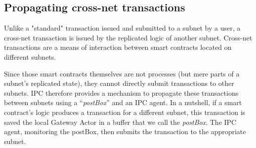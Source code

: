 

\subsection{Propagating cross-net transactions}

Unlike a "standard" transaction issued and submitted to a subnet by a user,
a cross-net transaction is issued by the replicated logic of another subnet.
Cross-net transactions are a means of interaction between smart contracts located on different subnets.

Since those smart contracts themselves are not processes (but mere parts of a subnet's replicated state),
they cannot directly submit transactions to other subnets.
IPC therefore provides a mechanism to propagate these transactions between subnets using a ``\emph{postBox}'' and an IPC agent.
In a nutshell, if a smart contract's logic produces a transaction for a different subnet,
this transaction is saved the local Gateway Actor in a buffer that we call the \emph{postBox}.
The IPC agent, monitoring the postBox, then submits the transaction to the appropriate subnet.

